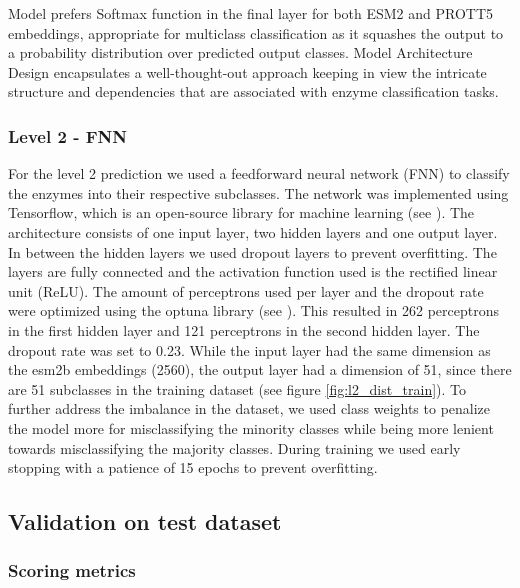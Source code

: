 \documentclass{bioinfo}
\begin{document}
\begin{methods}
Model prefers Softmax function in the final layer for both ESM2 and PROTT5 embeddings, %
appropriate for multiclass classification as it squashes the output to a probability distribution over predicted output classes.
Model Architecture Design encapsulates a well-thought-out approach keeping in view the intricate structure and dependencies that 
are associated with enzyme classification tasks.

\subsubsection{Level 2 - FNN}
For the level 2 prediction we used a feedforward neural network (FNN) to classify the enzymes into their respective subclasses.
The network was implemented using Tensorflow, which is an open-source library for machine learning (see \cite{tensorflow2015-whitepaper}).
The architecture consists of one input layer, two hidden layers and one output layer.
In between the hidden layers we used dropout layers to prevent overfitting.
The layers are fully connected and the activation function used is the rectified linear unit (ReLU).
The amount of perceptrons used per layer and the dropout rate were optimized using the optuna library (see \cite{optuna_2019}).
This resulted in 262 perceptrons in the first hidden layer and 121 perceptrons in the second hidden layer.
The dropout rate was set to 0.23.
While the input layer had the same dimension as the esm2b embeddings (2560), the output layer had a dimension of 51,
since there are 51 subclasses in the training dataset (see figure \ref{fig:l2_dist_train}).
To further address the imbalance in the dataset, we used class weights to penalize the model more for misclassifying the minority classes
while being more lenient towards misclassifying the majority classes.
During training we used early stopping with a patience of 15 epochs to prevent overfitting.


\subsection{Validation on test dataset}

\subsubsection{Scoring metrics}


\end{methods}
\end{document}
